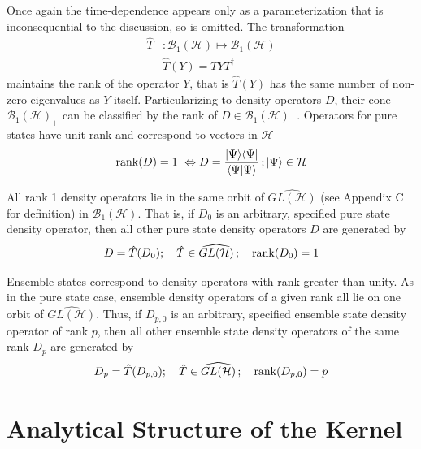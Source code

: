 \documentclass[aps,preprint]{revtex4}%
\begin{document}
\noindent Once again the time-dependence appears only as a parameterization
that is inconsequential to the discussion, so is omitted. The transformation
\begin{align}
\hat{T}  &  :\mathcal{B}_{1}(\mathcal{H})\mapsto\mathcal{B}_{1}\left(
\mathcal{H}\right) \nonumber\\
&  \hat{T}(Y)=TYT^{\dagger}%
\end{align}
maintains the rank of the operator $Y$, that is $\hat{T}(Y)$ has the same
number of non-zero eigenvalues as $Y$ itself. Particularizing to density
operators $D$, their cone $\mathcal{B}_{1}(\mathcal{H})_{+}$ can be classified
by the rank of $D\in\mathcal{B}_{1}(\mathcal{H})_{+}$. Operators for pure
states have unit rank and correspond to vectors in $\mathcal{H}$
\begin{equation}
\mathop{\rm rank}\nolimits(D)=1\,\,\Leftrightarrow D=\frac{|\Psi\rangle
\langle\Psi|}{\langle\Psi|\Psi\rangle}\,;|\Psi\rangle\in\mathcal{H}%
\end{equation}


All rank 1 density operators lie in the same orbit of $\widehat{GL(\mathcal{H}%
)} $ (see Appendix C for definition) in $\mathcal{B}_{1}(\mathcal{H})$. That
is, if $D_{0}$ is an arbitrary, specified pure state density operator, then
all other pure state density operators $D$ are generated by
\begin{equation}
D=\hat{T}(D_{0});\quad\hat{T}\in\widehat{GL(\mathcal{H})}\,;\quad
\mathop{\rm rank}\nolimits(D_{0})=1
\end{equation}


Ensemble states correspond to density operators with rank greater than unity.
As in the pure state case, ensemble density operators of a given rank all lie
on one orbit of $\widehat{GL(\mathcal{H})}$. Thus, if $D_{p,0}$ is an
arbitrary, specified ensemble state density operator of rank $p$, then all
other ensemble state density operators of the same rank $D_{p}$ are generated
by
\begin{equation}
D_{p}=\hat{T}(D_{p,0});\quad\hat{T}\in\widehat{GL(\mathcal{H})}\,;\quad
\mathop{\rm rank}\nolimits(D_{p,0})=p
\end{equation}


\section{Analytical Structure of the Kernel}
\end{document}
